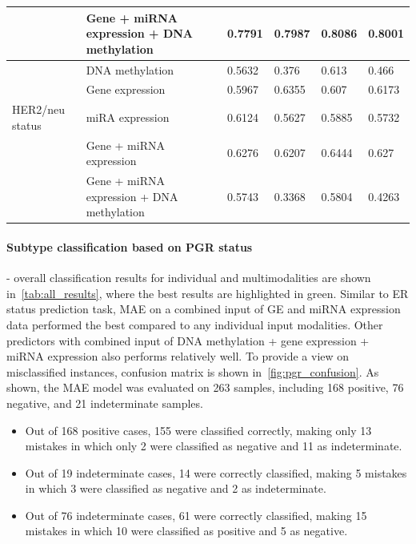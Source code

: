 \begin{table}[h]
\begin{tabular}{l|l|l|l|l|l}
        \cline{2-6}
                     & Gene + miRNA expression + DNA methylation & 0.7791 & 0.7987    & 0.8086 & 0.8001  \\ 
        \hline
                    & DNA methylation   & 0.5632 & 0.376     & 0.613  & 0.466   \\ 
        \cline{2-6}
                     & Gene expression   & 0.5967 & 0.6355    & 0.607  & 0.6173  \\ 
        \cline{2-6}
        HER2/neu status & miRA expression  & 0.6124 & 0.5627    & 0.5885 & 0.5732  \\ 
        \cline{2-6}
                   & Gene + miRNA expression   & 0.6276 & 0.6207    & 0.6444 & 0.627   \\ 
        \cline{2-6}
                   & Gene + miRNA expression + DNA methylation & 0.5743 & 0.3368    & 0.5804 & 0.4263  \\
        \hline
    \end{tabular}
    \vspace{-2mm}
\end{table}

\paragraph{Subtype classification based on PGR status} - overall classification results for individual and multimodalities are shown in~\cref{tab:all_results}, where the best results are highlighted in green. Similar to ER status prediction task, MAE on a combined input of GE and miRNA expression data performed the best compared to any individual input modalities. Other predictors with combined input of DNA methylation + gene expression + miRNA expression also performs relatively well. To provide a view on misclassified instances, confusion matrix is shown in~\cref{fig:pgr_confusion}. As shown, the MAE model was evaluated on 263 samples, including 168 positive, 76 negative, and 21 indeterminate samples. 

\begin{itemize}[noitemsep]
    \item Out of 168 positive cases, 155 were classified correctly, making only 13 mistakes in which only 2 were classified as negative and 11 as indeterminate. 

    \item Out of 19 indeterminate cases, 14 were correctly classified, making 5 mistakes in which 3 were classified as negative and 2 as indeterminate. 

    \item Out of 76 indeterminate cases, 61 were correctly classified, making 15 mistakes in which 10 were classified as positive and 5 as negative.  
\end{itemize}

